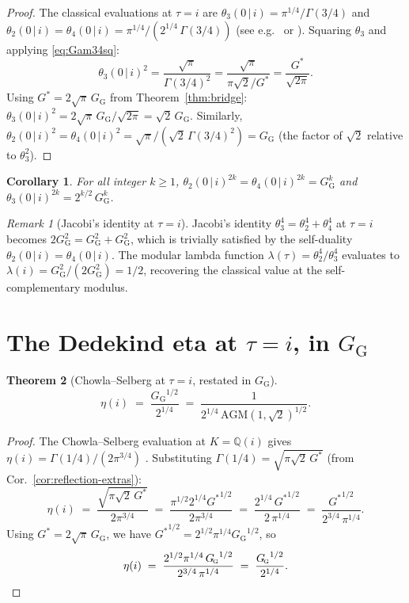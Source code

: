 \documentclass[11pt]{article}
\newtheorem{theorem}{Theorem}[section]
\newtheorem{corollary}[theorem]{Corollary}
\theoremstyle{definition}
\theoremstyle{remark}
\newtheorem*{remark}{Remark}
\newcommand{\Gs}{G^{*}}
\newcommand{\GG}{G_{\!\scriptscriptstyle\mathrm{G}}}
\newcommand{\Q}{\mathbb{Q}}
\newcommand{\AGM}{\mathrm{AGM}}
\begin{document}
\begin{proof}
The classical evaluations at $\tau = i$ are
$\theta_3(0\,|\,i) = \pi^{1/4}/\Gamma(3/4)$ and
$\theta_2(0\,|\,i) = \theta_4(0\,|\,i) = \pi^{1/4}/(2^{1/4}\,\Gamma(3/4))$
(see e.g.\ \cite[\S{}21.5]{whittaker-watson} or \cite[Eq.~2.7.6]{borweinAGM}).
Squaring $\theta_3$ and applying \eqref{eq:Gam34sq}:
\[
\theta_3(0\,|\,i)^2 = \frac{\sqrt\pi}{\Gamma(3/4)^2}
                    = \frac{\sqrt\pi}{\pi\sqrt 2/\Gs}
                    = \frac{\Gs}{\sqrt{2\pi}}.
\]
Using $\Gs = 2\sqrt\pi\,\GG$ from Theorem~\ref{thm:bridge}:
$\theta_3(0\,|\,i)^2 = 2\sqrt\pi\,\GG/\sqrt{2\pi} = \sqrt 2\,\GG$.
Similarly, $\theta_2(0\,|\,i)^2 = \theta_4(0\,|\,i)^2 = \sqrt{\pi}/(\sqrt 2\,\Gamma(3/4)^2)
= \GG$ (the factor of $\sqrt 2$ relative to $\theta_3^2$).
\end{proof}

\begin{corollary}\label{cor:theta-higher}
For all integer $k \geq 1$,
$\theta_2(0\,|\,i)^{2k} = \theta_4(0\,|\,i)^{2k} = \GG^k$ and
$\theta_3(0\,|\,i)^{2k} = 2^{k/2}\,\GG^k$.
\end{corollary}

\begin{remark}[Jacobi's identity at $\tau = i$]
Jacobi's identity $\theta_3^4 = \theta_2^4 + \theta_4^4$ at $\tau = i$ becomes
$2\GG^2 = \GG^2 + \GG^2$, which is trivially satisfied by the self-duality
$\theta_2(0\,|\,i) = \theta_4(0\,|\,i)$. The modular lambda function
$\lambda(\tau) = \theta_2^4/\theta_3^4$ evaluates to
$\lambda(i) = \GG^2/(2\GG^2) = 1/2$, recovering the classical value at the
self-complementary modulus.
\end{remark}

\section{The Dedekind eta at $\tau = i$, in $\GG$}\label{sec:eta}

\begin{theorem}[Chowla--Selberg at $\tau = i$, restated in $\GG$]\label{thm:eta-i}
\[
\eta(i) \;=\; \frac{{\GG}^{1/2}}{2^{1/4}} \;=\; \frac{1}{2^{1/4}\,\AGM(1,\sqrt 2)^{1/2}}.
\]
\end{theorem}

\begin{proof}
The Chowla--Selberg evaluation at $K = \Q(i)$ gives $\eta(i) =
\Gamma(1/4)/(2\pi^{3/4})$ \cite{chowlaselberg,cohenII}. Substituting
$\Gamma(1/4) = \sqrt{\pi\sqrt 2\,\Gs}$ (from Cor.~\ref{cor:reflection-extras}):
\[
\eta(i) \;=\; \frac{\sqrt{\pi\sqrt 2\,\Gs}}{2\pi^{3/4}} \;=\; \frac{\pi^{1/2} 2^{1/4} {\Gs}^{1/2}}{2\pi^{3/4}} \;=\; \frac{2^{1/4}\,{\Gs}^{1/2}}{2\,\pi^{1/4}} \;=\; \frac{{\Gs}^{1/2}}{2^{3/4}\,\pi^{1/4}}.
\]
Using $\Gs = 2\sqrt\pi\,\GG$, we have ${\Gs}^{1/2} = 2^{1/2}\pi^{1/4}{\GG}^{1/2}$, so
\[
\eta(i) \;=\; \frac{2^{1/2}\pi^{1/4}\,{\GG}^{1/2}}{2^{3/4}\,\pi^{1/4}} \;=\; \frac{{\GG}^{1/2}}{2^{1/4}}. \qedhere
\]
\end{proof}
\end{document}
